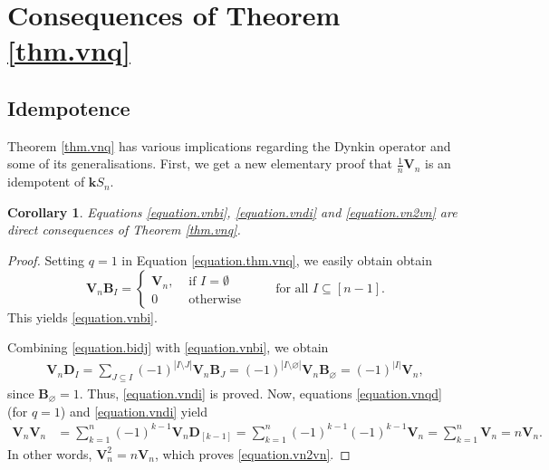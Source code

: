 \documentclass[revision]{FPSAC2025}
\newtheorem{corollary}{Corollary}
\newcommand{\VV}{\mathbf{V}} %
\newcommand{\BB}{\mathbf{B}} %
\newcommand{\DD}{\mathbf{D}} %
\newenvironment{verlong}{}{}
\newenvironment{vershort}{}{}
\begin{document}
\section{Consequences of Theorem \ref{thm.vnq}}
\subsection{Idempotence}
Theorem \ref{thm.vnq} has various implications regarding the Dynkin operator and some of its generalisations. First, we get a new elementary proof that $\frac{1}{n}\mathbf{V}_n$ is an idempotent of $\mathbf{k}S_n$. 
%
\begin{corollary}
Equations \eqref{equation.vnbi}, \eqref{equation.vndi} and \eqref{equation.vn2vn} are direct consequences of Theorem \ref{thm.vnq}.
\end{corollary}
\begin{proof}
Setting $q=1$ in Equation \eqref{equation.thm.vnq}, we
\begin{vershort}
easily obtain
\end{vershort}
\begin{verlong}
obtain
\begin{equation*}
\mathbf{V}_n\mathbf{B}_I
= \begin{cases} \mathbf{V}_n, & \text{ if } I=\emptyset \\ 0 & \text{ otherwise}\end{cases}
\qquad \text{ for all } I \subseteq [n-1].
\end{equation*}
This yields
\end{verlong}
\eqref{equation.vnbi}.

Combining \eqref{equation.bidj} with \eqref{equation.vnbi}, we obtain
\begin{align*}
\VV_n \DD_I = \sum_{J \subseteq I}(-1)^{|I \setminus J|}\VV_n \BB_J
= (-1)^{|I \setminus \varnothing|}\VV_n \BB_\varnothing
= (-1)^{|I|}\VV_n,
\end{align*}
since $\BB_\varnothing = 1$.
Thus, \eqref{equation.vndi} is proved. Now, equations \eqref{equation.vnqd} (for $q=1$) and \eqref{equation.vndi} yield
\begin{align*}
\mathbf{V}_n\mathbf{V}_n &= \sum_{k=1}^n (-1)^{k-1} \VV_n \mathbf{D}_{[k-1]}
= \sum_{k=1}^n (-1)^{k-1} (-1)^{k-1} \VV_n
= \sum_{k=1}^n \VV_n
= n \VV_n .
\end{align*}
In other words, $\mathbf{V}_n^2 = n\mathbf{V}_n$, which proves \eqref{equation.vn2vn}.
\end{proof}
%
\end{document}

